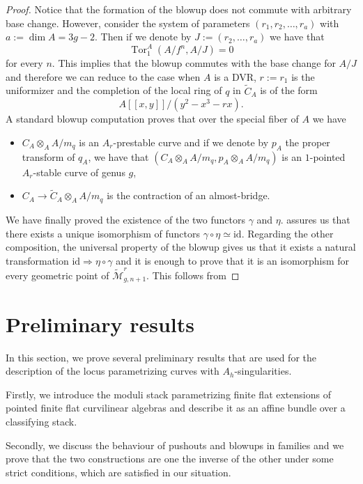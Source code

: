 \documentclass{alggeom}
\numberwithin{equation}{section}
\numberwithin{subsection}{section}
\theoremstyle{definition}
\theoremstyle{remark}
\newcommand\tor{\operatorname{Tor}}
\newcommand\id{\mathrm{id}}
\newcommand{\Mtilde}{\widetilde{\mathcal M}}
\begin{document}
\begin{proof}
	Notice that the formation of the blowup does not commute with arbitrary base change. However, consider the system of parameters $(r_1,r_2,\dots,r_a)$ with $a:=\dim A=3g-2$. Then if we denote by $J:=(r_2,\dots,r_a)$ we have that 
	$$ \tor_1^A(A/f^n,A/J)=0$$
	for every $n$. This implies that the blowup commutes with the base change for $A/J$ and therefore we can reduce to the case when $A$ is a DVR, $r:=r_1$ is the uniformizer and the completion of the local ring of $q$ in $\widetilde{C}_A$ is of the form 
	$$ A[[x,y]]/(y^2-x^3-rx).$$ 
	A standard blowup computation proves that over the special fiber of $A$ we have
	\begin{itemize}
		\item $C_A\otimes_A A/m_q$ is an $A_r$-prestable curve and if we denote by $p_A$ the proper transform of $q_A$, we have that $(C_A \otimes_A A/m_q, p_A \otimes_A A/m_q)$ is an $1$-pointed $A_r$-stable curve of genus $g$,  
		\item $C_A \rightarrow \widetilde{C}_A \otimes_A A/m_q$ is the contraction of an almost-bridge.
    \end{itemize}  
	
	We have finally proved the existence of the two functors $\gamma$ and $\eta$.  assures us that there exists a unique isomorphism of functors $\gamma \circ \eta \simeq \id$. Regarding the other composition, the universal property of the blowup gives us that it exists a natural transformation $\id \Rightarrow \eta \circ \gamma $ and it is enough to prove that it is an isomorphism for every geometric point of $\Mtilde_{g,n+1}^r$. This follows from 
\end{proof}



\section{Preliminary results}\label{sec:3}
In this section, we prove several preliminary results that are used for the description of the locus parametrizing curves with $A_h$-singularities.

Firstly, we introduce the moduli stack parametrizing finite flat extensions of pointed finite flat curvilinear algebras and describe it as an affine bundle over a classifying stack.

Secondly, we discuss the behaviour of pushouts and blowups in families and we prove that the two constructions are one the inverse of the other under some strict conditions, which are satisfied in our situation.
\end{document}
